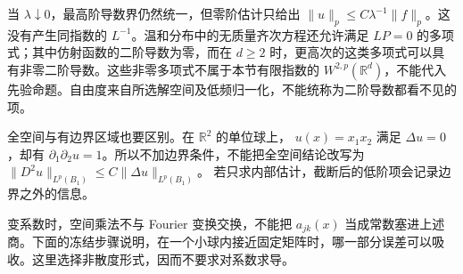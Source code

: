 \ProseParagraphBreak

当 \(\lambda\downarrow0\)，最高阶导数界仍然统一，但零阶估计只给出
\(\|u\|_p\leq C\lambda^{-1}\|f\|_p\)。这没有产生同指数的 \(L^{-1}\)。温和分布中的无质量齐次方程还允许满足 \(LP=0\) 的多项式；其中仿射函数的二阶导数为零，而在 \(d\geq2\) 时，更高次的这类多项式可以具有非零二阶导数。这些非零多项式不属于本节有限指数的 \(W^{2,p}(\mathbb R^d)\)，不能代入先验命题。自由度来自所选解空间及低频归一化，不能统称为二阶导数都看不见的项。

\ProseParagraphBreak

全空间与有边界区域也要区别。在 \(\mathbb R^2\) 的单位球上，
\(u(x)=x_1x_2\) 满足 \(\Delta u=0\)，却有
\(\partial_1\partial_2u=1\)。所以不加边界条件，不能把全空间结论改写为
\(\|D^2u\|_{L^p(B_1)}\leq C\|\Delta u\|_{L^p(B_1)}\)。
若只求内部估计，截断后的低阶项会记录边界之外的信息。

\ProseParagraphBreak

变系数时，空间乘法不与 Fourier 变换交换，不能把 \(a_{jk}(x)\) 当成常数塞进上述商。下面的冻结步骤说明，在一个小球内接近固定矩阵时，哪一部分误差可以吸收。这里选择非散度形式，因而不要求对系数求导。

